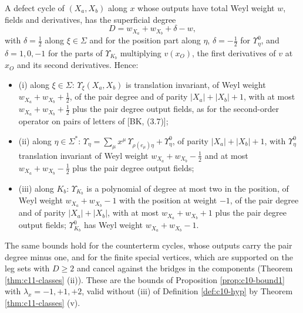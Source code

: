 \begin{proposition}
\label{prop:c11-oddbound}
A defect cycle of $(X_a,X_b)$ along $x$ whose outputs have total Weyl weight $w$, fields and derivatives, has the superficial degree
\[
D=w_{X_a}+w_{X_b}+\delta-w,
\]
with $\delta=\tfrac12$ along $\xi\in\Sigma$ and for the position part along $\eta$, $\delta=-\tfrac12$ for $\Upsilon^0_\eta$, and $\delta=1,0,-1$ for the parts of $\Upsilon_{K_b}$ multiplying $v(x_O)$, the first derivatives of $v$ at $x_O$ and its second derivatives. Hence:
\begin{itemize}
\item (i) along $\xi\in\Sigma$: $\Upsilon_\xi(X_a,X_b)$ is translation invariant, of Weyl weight $w_{X_a}+w_{X_b}+\tfrac12$, of the pair degree and of parity $|X_a|+|X_b|+1$, with at most $w_{X_a}+w_{X_b}+\tfrac12$ plus the pair degree output fields, as for the second-order operator on pairs of letters of [BK, (3.7)];
\item (ii) along $\eta\in\Sigma^*$: $\Upsilon_\eta=\sum_\mu x^\mu\,\Upsilon_{\rho(e_\mu)\eta}+\Upsilon^0_\eta$, of parity $|X_a|+|X_b|+1$, with $\Upsilon^0_\eta$ translation invariant of Weyl weight $w_{X_a}+w_{X_b}-\tfrac12$ and at most $w_{X_a}+w_{X_b}-\tfrac12$ plus the pair degree output fields;
\item (iii) along $K_b$: $\Upsilon_{K_b}$ is a polynomial of degree at most two in the position, of Weyl weight $w_{X_a}+w_{X_b}-1$ with the position at weight $-1$, of the pair degree and of parity $|X_a|+|X_b|$, with at most $w_{X_a}+w_{X_b}+1$ plus the pair degree output fields; $\Upsilon^0_{K_b}$ has Weyl weight $w_{X_a}+w_{X_b}-1$.
\end{itemize}
The same bounds hold for the counterterm cycles, whose outputs carry the pair degree minus one, and for the finite special vertices, which are supported on the leg sets with $D\ge2$ and cancel against the bridges in the components (Theorem \ref{thm:c11-classes} (ii)). These are the bounds of Proposition \ref{prop:c10-bound1} with $\lambda_x=-1,+1,+2$, valid without (iii) of Definition \ref{def:c10-hyp} by Theorem \ref{thm:c11-classes} (v).
\end{proposition}

